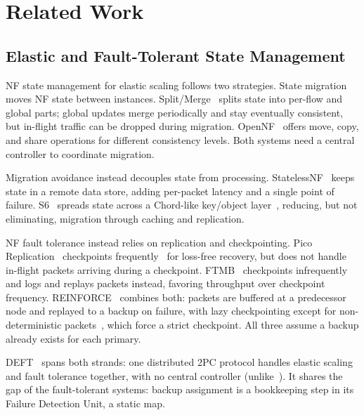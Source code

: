 \documentclass[journal]{IEEEtran}
\begin{document}
\section{Related Work}
\label{sec:related}

\subsection{Elastic and Fault-Tolerant State Management}

NF state management for elastic scaling follows two strategies. State migration
moves NF state between instances. Split/Merge~\cite{rajagopalan2013split} splits state
into per-flow and global parts; global updates merge periodically and stay eventually
consistent, but in-flight traffic can be dropped during migration. OpenNF~\cite{gember2014opennf}
offers move, copy, and share operations for different consistency levels. Both systems need a central controller to coordinate migration. 

Migration avoidance instead decouples state from processing. StatelessNF~\cite{kablan2017stateless,szalay2019industrial} keeps state in a remote data store, adding per-packet latency and a single point of failure. S6~\cite{woo2018elastic} spreads state across a Chord-like key/object layer~\cite{stoica2003chord}, reducing, but not eliminating, migration through caching and
replication.

NF fault tolerance instead relies on replication and checkpointing. Pico Replication~\cite{rajagopalan2013pico} checkpoints frequently~\cite{plank1994libckpt} for loss-free recovery, but does not handle in-flight packets arriving during a checkpoint. FTMB~\cite{sherry2015rollback} checkpoints infrequently and logs and replays packets instead, favoring throughput over checkpoint frequency. REINFORCE~\cite{kulkarni2018reinforce} combines both: packets are buffered at a predecessor node and replayed to a backup on failure, with lazy
checkpointing except for non-deterministic packets~\cite{cachin2016non}, which force a
strict checkpoint. All three assume a backup already exists for each primary.

DEFT~\cite{shahriyar2023deft} spans both strands: one distributed 2PC protocol handles
elastic scaling and fault tolerance together, with no central controller
(unlike~\cite{gember2014opennf,rajagopalan2013split}). It shares the gap of the fault-tolerant systems: backup assignment is a bookkeeping step in its Failure Detection Unit, a static map.
\end{document}
